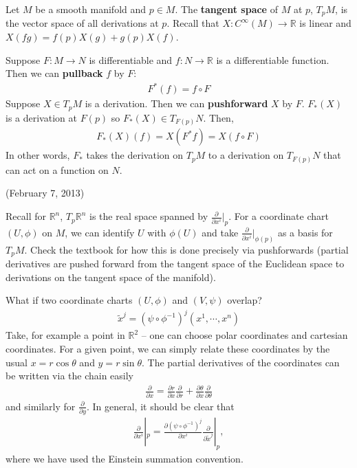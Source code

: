 \documentclass{../mathnotes}
\begin{document}
\begin{defn}
    Let $M$ be a smooth manifold and $p\in M$. The \textbf{tangent space} of $M$ at $p$, $T_pM$, is the vector space of all derivations at $p$.
    Recall that $X:C^\infty(M)\to\mathbb{R}$ is linear and $X(fg)=f(p)X(g)+g(p)X(f)$.
\end{defn}

\begin{rem}
    Suppose $F:M\to N$ is differentiable and $f: N\to \mathbb{R}$ is a differentiable function. Then we can \textbf{pullback} $f$ by $F$:
    \begin{align*}
        F^*(f)=f\circ F
    \end{align*}
    Suppose $X\in T_pM$ is a derivation. Then we can \textbf{pushforward} $X$ by $F$. $F_*(X)$ is a derivation at $F(p)$ so $F_*(X)\in T_{F(p)}N$.
    Then,
    \begin{align*}
        F_*(X)(f)=X(F^*f)=X(f\circ F)
    \end{align*}
    In other words, $F_*$ takes the derivation on $T_pM$ to a derivation on $T_{F(p)}N$ that can act on a function on $N$.
\end{rem}

(February 7, 2013)

Recall for $\mathbb{R}^n$, $T_p\mathbb{R}^n$ is the real space spanned by $\frac{\partial}{\partial x^i}|_p$. For a coordinate chart $(U,\phi)$ on $M$, we can
identify $U$ with $\phi(U)$ and take $\frac{\partial}{\partial x^i}|_{\phi(p)}$ as a basis for $T_pM$. Check the textbook for how this is done precisely via
pushforwards (partial derivatives are pushed forward from the tangent space of the Euclidean space to derivations on the tangent space of the manifold).

What if two coordinate charts $(U,\phi)$ and $(V,\psi)$ overlap?
\begin{align*}
    \tilde{x}^j=(\psi\circ\phi^{-1})^j(x^1,\cdots,x^n)
\end{align*}
Take, for example a point in $\mathbb{R}^2$ -- one can choose polar coordinates and cartesian coordinates. For a given point, we can simply relate these coordinates
by the usual $x=r\cos\theta$ and $y=r\sin\theta$. The partial derivatives of the coordinates can be written via the chain easily
\begin{align*}
    \frac{\partial}{\partial x}=\frac{\partial r}{\partial x}\frac{\partial}{\partial r} + \frac{\partial \theta}{\partial x}\frac{\partial}{\partial \theta}
\end{align*}
and similarly for $\frac{\partial}{\partial y}$. In general, it should be clear that
\begin{align*}
    \frac{\partial}{\partial x^i}|_p=\frac{\partial (\psi\circ\phi^{-1})^j}{\partial x^i}\frac{\partial}{\partial \tilde{x}^j}|_p,
\end{align*}
where we have used the Einstein summation convention.
\end{document}
